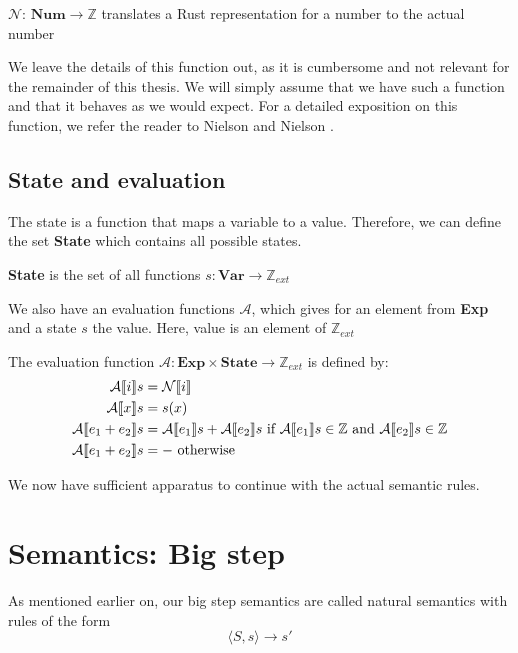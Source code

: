 \begin{definition}
$\mathcal{N}$: $\textbf{Num} \to \mathbb{Z}$ translates a Rust representation for a number to the actual number
\end{definition}

We leave the details of this function out, as it is cumbersome and not relevant for the remainder of this thesis. We will simply assume that we have such a function and that it behaves as we would expect. For a detailed exposition on this function, we refer the reader to Nielson and Nielson \cite{nielson1992semantics}. 

\subsection*{State and evaluation}
The state is a function that maps a variable to a value. Therefore, we can define the set \textbf{State} which contains all possible states. 

\begin{definition}
\textbf{State} is the set of all functions $s: \textbf{Var} \to \mathbb{Z}_{ext}$
\end{definition}

We also have an evaluation functions $\mathcal{A}$, which gives for an element from \textbf{Exp} and a state $s$ the value. Here, value is an element of $\mathbb{Z}_{ext}$

\begin{definition}
The evaluation function $\mathcal{A}: \textbf{Exp} \times \textbf{State} \to \mathbb{Z}_{ext}$ is defined by:
\begin{align*}
    \mathcal{A} \llbracket i \rrbracket s          &= \mathcal{N} \llbracket i \rrbracket
\\  \mathcal{A} \llbracket x \rrbracket s          &= s(x)
\\  \mathcal{A} \llbracket e_1 + e_2 \rrbracket s  &= \mathcal{A} \llbracket e_1 \rrbracket s + \mathcal{A} \llbracket e_2 \rrbracket s \textrm{ if } \mathcal{A} \llbracket e_1 \rrbracket s \in \mathbb{Z} \textrm{ and } \mathcal{A} \llbracket e_2 \rrbracket s \in \mathbb{Z}
\\  \mathcal{A} \llbracket e_1 + e_2 \rrbracket s  &= - \textrm{ otherwise}
\end{align*}
\end{definition}

We now have sufficient apparatus to continue with the actual semantic rules. 

\section{Semantics: Big step}
As mentioned earlier on, our big step semantics are called natural semantics with rules of the form 
$$\langle S, s \rangle \to s'$$

